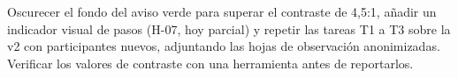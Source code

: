 Oscurecer el fondo del aviso verde para superar el contraste de 4,5:1, añadir un indicador visual de pasos (H-07, hoy parcial) y repetir las tareas T1 a T3 sobre la v2 con participantes nuevos, adjuntando las hojas de observación anonimizadas. Verificar los valores de contraste con una herramienta antes de reportarlos.
